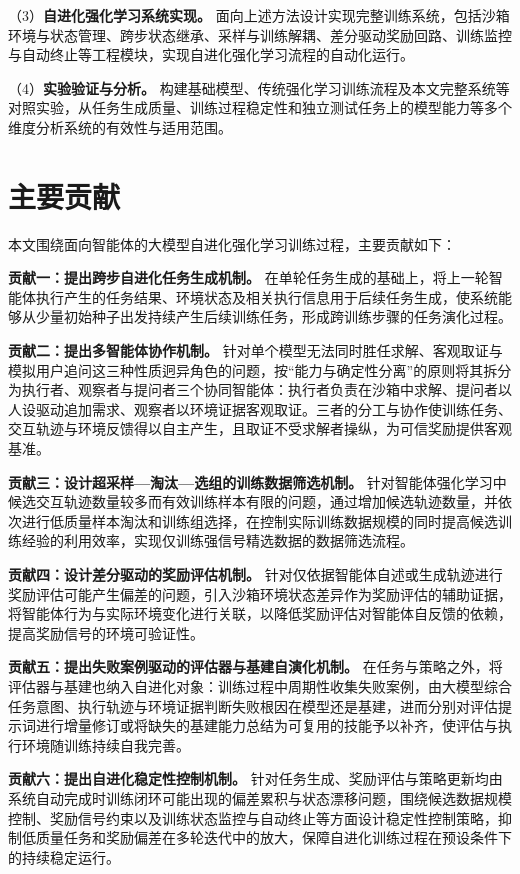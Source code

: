 （3）\textbf{自进化强化学习系统实现。} 面向上述方法设计实现完整训练系统，包括沙箱环境与状态管理、跨步状态继承、采样与训练解耦、差分驱动奖励回路、训练监控与自动终止等工程模块，实现自进化强化学习流程的自动化运行。

（4）\textbf{实验验证与分析。} 构建基础模型、传统强化学习训练流程及本文完整系统等对照实验，从任务生成质量、训练过程稳定性和独立测试任务上的模型能力等多个维度分析系统的有效性与适用范围。

\section{主要贡献}

本文围绕面向智能体的大模型自进化强化学习训练过程，主要贡献如下：

\textbf{贡献一：提出跨步自进化任务生成机制。}\label{contrib:cross_step}
在单轮任务生成的基础上，将上一轮智能体执行产生的任务结果、环境状态及相关执行信息用于后续任务生成，使系统能够从少量初始种子出发持续产生后续训练任务，形成跨训练步骤的任务演化过程。

\textbf{贡献二：提出多智能体协作机制。}\label{contrib:multiagent}
针对单个模型无法同时胜任求解、客观取证与模拟用户追问这三种性质迥异角色的问题，按“能力与确定性分离”的原则将其拆分为执行者、观察者与提问者三个协同智能体：执行者负责在沙箱中求解、提问者以人设驱动追加需求、观察者以环境证据客观取证。三者的分工与协作使训练任务、交互轨迹与环境反馈得以自主产生，且取证不受求解者操纵，为可信奖励提供客观基准。

\textbf{贡献三：设计超采样—淘汰—选组的训练数据筛选机制。}\label{contrib:oversample}
针对智能体强化学习中候选交互轨迹数量较多而有效训练样本有限的问题，通过增加候选轨迹数量，并依次进行低质量样本淘汰和训练组选择，在控制实际训练数据规模的同时提高候选训练经验的利用效率，实现仅训练强信号精选数据的数据筛选流程。

\textbf{贡献四：设计差分驱动的奖励评估机制。}\label{contrib:diff_reward}
针对仅依据智能体自述或生成轨迹进行奖励评估可能产生偏差的问题，引入沙箱环境状态差异作为奖励评估的辅助证据，将智能体行为与实际环境变化进行关联，以降低奖励评估对智能体自反馈的依赖，提高奖励信号的环境可验证性。

\textbf{贡献五：提出失败案例驱动的评估器与基建自演化机制。}\label{contrib:badcase}
在任务与策略之外，将评估器与基建也纳入自进化对象：训练过程中周期性收集失败案例，由大模型综合任务意图、执行轨迹与环境证据判断失败根因在模型还是基建，进而分别对评估提示词进行增量修订或将缺失的基建能力总结为可复用的技能予以补齐，使评估与执行环境随训练持续自我完善。

\textbf{贡献六：提出自进化稳定性控制机制。}\label{contrib:stability}
针对任务生成、奖励评估与策略更新均由系统自动完成时训练闭环可能出现的偏差累积与状态漂移问题，围绕候选数据规模控制、奖励信号约束以及训练状态监控与自动终止等方面设计稳定性控制策略，抑制低质量任务和奖励偏差在多轮迭代中的放大，保障自进化训练过程在预设条件下的持续稳定运行。

